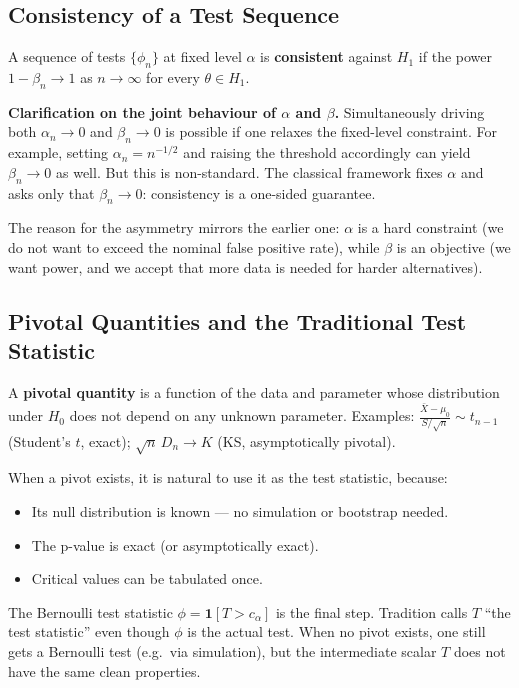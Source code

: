 \documentclass[11pt, a4paper]{article}
\begin{document}
\subsection{Consistency of a Test Sequence}

A sequence of tests $\{\phi_n\}$ at fixed level $\alpha$ is \textbf{consistent} against
$H_1$ if the power $1-\beta_n \to 1$ as $n\to\infty$ for every $\theta\in H_1$.

\textbf{Clarification on the joint behaviour of $\alpha$ and $\beta$.}
Simultaneously driving both $\alpha_n\to 0$ and $\beta_n\to 0$ is possible if one
relaxes the fixed-level constraint. For example, setting $\alpha_n = n^{-1/2}$ and
raising the threshold accordingly can yield $\beta_n\to 0$ as well. But this is
non-standard. The classical framework fixes $\alpha$ and asks only that $\beta_n\to 0$:
consistency is a one-sided guarantee.

The reason for the asymmetry mirrors the earlier one: $\alpha$ is a hard constraint
(we do not want to exceed the nominal false positive rate), while $\beta$ is an
objective (we want power, and we accept that more data is needed for harder alternatives).

\subsection{Pivotal Quantities and the Traditional Test Statistic}

A \textbf{pivotal quantity} is a function of the data and parameter whose distribution
under $H_0$ does not depend on any unknown parameter.
Examples: $\frac{\bar X - \mu_0}{S/\sqrt{n}} \sim t_{n-1}$ (Student's $t$, exact);
$\sqrt{n}\,D_n \to K$ (KS, asymptotically pivotal).

When a pivot exists, it is natural to use it as the test statistic, because:
\begin{itemize}
  \item Its null distribution is known --- no simulation or bootstrap needed.
  \item The p-value is exact (or asymptotically exact).
  \item Critical values can be tabulated once.
\end{itemize}

The Bernoulli test statistic $\phi = \mathbf{1}[T > c_\alpha]$ is the final step.
Tradition calls $T$ ``the test statistic'' even though $\phi$ is the actual test.
When no pivot exists, one still gets a Bernoulli test (e.g.\ via simulation), but the
intermediate scalar $T$ does not have the same clean properties.
\end{document}
